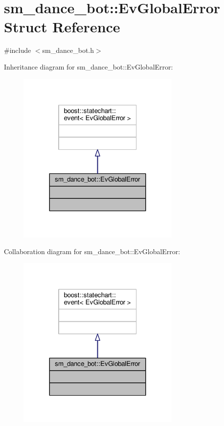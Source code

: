\hypertarget{structsm__dance__bot_1_1EvGlobalError}{}\section{sm\+\_\+dance\+\_\+bot\+:\+:Ev\+Global\+Error Struct Reference}
\label{structsm__dance__bot_1_1EvGlobalError}


{\ttfamily \#include $<$sm\+\_\+dance\+\_\+bot.\+h$>$}



Inheritance diagram for sm\+\_\+dance\+\_\+bot\+:\+:Ev\+Global\+Error\+:\nopagebreak
\begin{figure}[H]
\begin{center}
\leavevmode
\includegraphics[width=227pt]{structsm__dance__bot_1_1EvGlobalError__inherit__graph}
\end{center}
\end{figure}


Collaboration diagram for sm\+\_\+dance\+\_\+bot\+:\+:Ev\+Global\+Error\+:\nopagebreak
\begin{figure}[H]
\begin{center}
\leavevmode
\includegraphics[width=227pt]{structsm__dance__bot_1_1EvGlobalError__coll__graph}
\end{center}
\end{figure}


